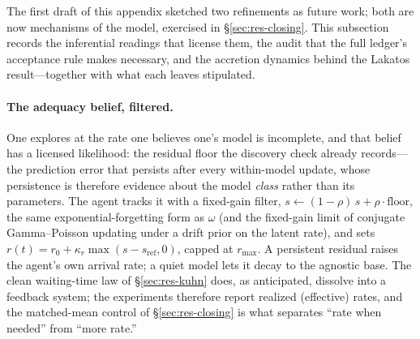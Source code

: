The first draft of this appendix sketched two refinements as future work; both are now
mechanisms of the model, exercised in \S\ref{sec:res-closing}. This subsection records the
inferential readings that license them, the audit that the full ledger's acceptance rule makes
necessary, and the accretion dynamics behind the Lakatos result---together with what each leaves
stipulated.

\paragraph{The adequacy belief, filtered.}
One explores at the rate one believes one's model is incomplete, and that belief has a licensed
likelihood: the residual floor the discovery check already records---the prediction error that
persists after every within-model update, whose persistence is therefore evidence about the
model \emph{class} rather than its parameters. The agent tracks it with a fixed-gain filter,
$s \leftarrow (1-\rho)\,s + \rho\cdot\mathrm{floor}$, the same exponential-forgetting form as
$\omega$ (and the fixed-gain limit of conjugate Gamma--Poisson updating under a drift prior on
the latent rate), and sets $r(t) = r_0 + \kappa_r \max(s - s_{\mathrm{ref}}, 0)$, capped at
$r_{\max}$. A persistent residual raises the agent's own arrival rate; a quiet model lets it
decay to the agnostic base. The clean waiting-time law of \S\ref{sec:res-kuhn} does, as
anticipated, dissolve into a feedback system; the experiments therefore report realized
(effective) rates, and the matched-mean control of \S\ref{sec:res-closing} is what separates
``rate when needed'' from ``more rate.''

